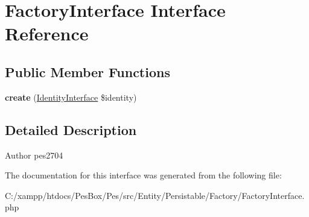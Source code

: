 \hypertarget{interface_pes_1_1_entity_1_1_persistable_1_1_factory_1_1_factory_interface}{}\section{Factory\+Interface Interface Reference}
\label{interface_pes_1_1_entity_1_1_persistable_1_1_factory_1_1_factory_interface}
\subsection*{Public Member Functions}
\begin{DoxyCompactItemize}
\item 
\mbox{\label{interface_pes_1_1_entity_1_1_persistable_1_1_factory_1_1_factory_interface_a40e9abc90d7646b331a2f7253a4b208c}} 
{\bfseries create} (\mbox{\hyperlink{interface_pes_1_1_entity_1_1_persistable_1_1_identity_interface}{Identity\+Interface}} \$identity)
\end{DoxyCompactItemize}


\subsection{Detailed Description}
\begin{DoxyAuthor}{Author}
pes2704 
\end{DoxyAuthor}


The documentation for this interface was generated from the following file\+:\begin{DoxyCompactItemize}
\item 
C\+:/xampp/htdocs/\+Pes\+Box/\+Pes/src/\+Entity/\+Persistable/\+Factory/Factory\+Interface.\+php\end{DoxyCompactItemize}
